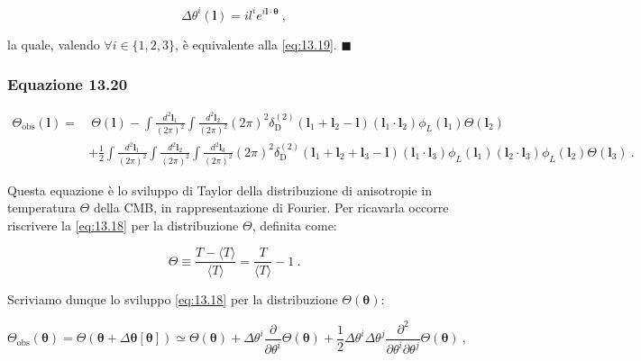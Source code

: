 \documentclass[a4paper,10pt]{article}
\newcommand{\B}{\boldsymbol}
\begin{document}
\begin{equation}
    \Delta \theta^i (\B l) = i  l^i e^{i \B l \cdot \B \theta} \ ,
\end{equation}

la quale, valendo $\forall i \in \{1,2,3\}$, è equivalente alla \eqref{eq:13.19}. \hfill $\blacksquare$ 





\subsubsection*{Equazione 13.20}

\begin{equation} \label{eq:13.20}
\begin{aligned}
\Theta_{\text{obs}}(\boldsymbol{l}) = & \ \Theta(\boldsymbol{l}) - \int \frac{d^2 \B l_1}{(2\pi)^2} \int \frac{d^2 \B l_2}{(2\pi)^2} (2\pi)^2 \delta_{\text{D}}^{(2)}(\boldsymbol{l}_1 + \boldsymbol{l}_2 - \boldsymbol{l}) (\boldsymbol{l}_1 \cdot \boldsymbol{l}_2) \phi_L(\boldsymbol{l}_1) \Theta(\boldsymbol{l}_2) \\
& + \frac{1}{2} \int \frac{d^2 \B l_1}{(2\pi)^2} \int \frac{d^2 \B l_2}{(2\pi)^2} \int \frac{d^2 \B l_3}{(2\pi)^2} (2\pi)^2 \delta_{\text{D}}^{(2)}(\boldsymbol{l}_1 + \boldsymbol{l}_2 + \boldsymbol{l}_3 - \boldsymbol{l})(\boldsymbol{l}_1 \cdot \boldsymbol{l}_3) \phi_L(\boldsymbol{l}_1) (\boldsymbol{l}_2 \cdot \boldsymbol{l}_3) \phi_L(\boldsymbol{l}_2) \Theta(\boldsymbol{l}_3) \ .
\end{aligned}
\end{equation}

Questa equazione è lo sviluppo di Taylor della distribuzione di anisotropie in temperatura $\Theta$ della CMB, in rappresentazione di Fourier.
Per ricavarla occorre riscrivere la \eqref{eq:13.18} per la distribuzione $\Theta$, definita come:

\begin{equation} \label{eq:thetaanisotrop}
    \Theta \equiv \frac{T - \langle T \rangle}{\langle T \rangle} = \frac{T}{\langle T \rangle} - 1 \ .
\end{equation}

Scriviamo dunque lo sviluppo \eqref{eq:13.18} per la distribuzione $\Theta(\B\theta)$:

\begin{equation} \label{eq:sviluppoanisotr}
    \Theta_{\mathrm{obs}}(\B\theta) = \Theta(\B\theta + \Delta \B\theta[\B\theta])
        \simeq \Theta(\B\theta) + \Delta \theta^i \frac{\partial}{\partial \theta^i} \Theta(\B\theta) + \frac{1}{2} \Delta \theta^i \Delta \theta^j \frac{\partial^2}{\partial \theta^i \partial \theta^j} \Theta(\B\theta) \ ,
\end{equation}
\end{document}
